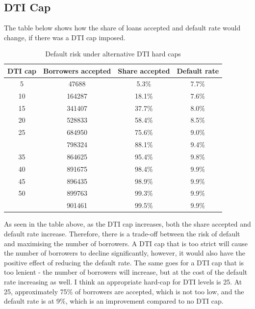 \documentclass[11pt,preprint]{elsarticle}
\numberwithin{equation}{section}
\numberwithin{figure}{section}
\numberwithin{table}{section}
\begin{document}
\subsection{DTI Cap}\label{dti-cap}

The table below shows how the share of loans accepted and default rate
would change, if there was a DTI cap imposed.

\begin{longtable}[t]{cccc}
\caption{\label{tab:unnamed-chunk-16}Default risk under alternative DTI hard caps}\\
\toprule
DTI cap & Borrowers accepted & Share accepted & Default rate\\
\midrule
5 & 47688 & 5.3\% & 7.7\%\\
10 & 164287 & 18.1\% & 7.6\%\\
15 & 341407 & 37.7\% & 8.0\%\\
20 & 528833 & 58.4\% & 8.5\%\\
25 & 684950 & 75.6\% & 9.0\%\\
\addlinespace
30 & 798324 & 88.1\% & 9.4\%\\
35 & 864625 & 95.4\% & 9.8\%\\
40 & 891675 & 98.4\% & 9.9\%\\
45 & 896435 & 98.9\% & 9.9\%\\
50 & 899763 & 99.3\% & 9.9\%\\
\addlinespace
55 & 901461 & 99.5\% & 9.9\%\\
\bottomrule
\end{longtable}

As seen in the table above, as the DTI cap increases, both the share
accepted and default rate increase. Therefore, there is a trade-off
between the risk of default and maximising the number of borrowers. A
DTI cap that is too strict will cause the number of borrowers to decline
significantly, however, it would also have the positive effect of
reducing the default rate. The same goes for a DTI cap that is too
lenient - the number of borrowers will increase, but at the cost of the
default rate increasing as well. I think an appropriate hard-cap for DTI
levels is 25. At 25, approximately 75\% of borrowers are accepted, which
is not too low, and the default rate is at 9\%, which is an improvement
compared to no DTI cap.


\end{document}

